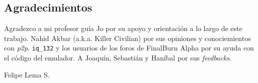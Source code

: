 \documentclass[12pt,spanish,letterpaper,color]{uchile}
\begin{document}
\begin{preface}
\section{Agradecimientos}
Agradezco a mi profesor guía Jo por su apoyo y orientación a lo largo de este trabajo. Nahid
Akbar (a.k.a. Killer Civilian) por sus opiniones y conociemientos con \kai \textit{p2p}.
\texttt{iq\_132} y los usuarios de los foros de FinalBurn Alpha por su ayuda con el código del
emulador. A Joaquín, Sebastián y Haníbal por sus \textit{feedbacks}.\\

\begin{flushright}
Felipe Lema S.
\end{flushright}
\tableofcontents
\listoffigures

\end{preface}

%
%
%
%
%
%


{}

\end{document}
